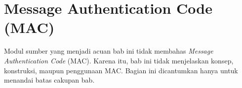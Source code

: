 \section{Message Authentication Code (MAC)}
\label{sec:mac}

Modul sumber yang menjadi acuan bab ini tidak membahas \textit{Message
Authentication Code} (MAC). Karena itu, bab ini tidak menjelaskan konsep,
konstruksi, maupun penggunaan MAC. Bagian ini dicantumkan hanya untuk menandai
batas cakupan bab.
